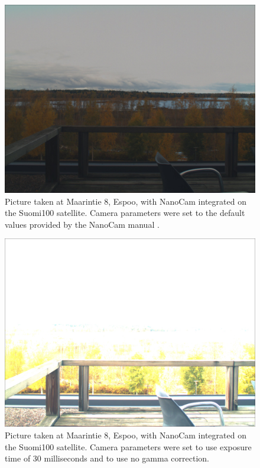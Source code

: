 \documentclass[english,12pt,a4paper,pdftex,elec,utf8]{aaltothesis}
\begin{document}
\begin{figure}[h!]
\centering
\includegraphics[scale=0.2]{def}
\caption{Picture taken at Maarintie 8, Espoo, with NanoCam integrated on the Suomi100 satellite. Camera parameters were set to the default values provided by the NanoCam manual \cite{nanocamds}.}
\label{camerapic1}
\end{figure}
\begin{figure}[h!]
\centering
\includegraphics[scale=0.2]{def23}
\caption{Picture taken at Maarintie 8, Espoo, with NanoCam integrated on the Suomi100 satellite. Camera parameters were set to use exposure time of 30 milliseconds and to use no gamma correction.}
\label{camerapic2}
\end{figure}
\end{document}
